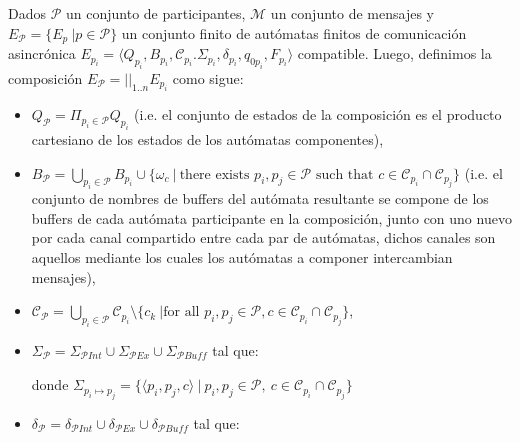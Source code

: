 \begin{definition}[Composición]\label{def:comp}
\label{composicion}
Dados $\mathcal{P}$ un conjunto de participantes, $\mathcal{M}$ un conjunto de mensajes y $E_\mathcal{P} = \{E_{p} \ | p \in \mathcal{P}\}$ un conjunto finito de autómatas finitos de comunicación asincrónica $E_{p_i}= \langle Q_{p_i}, B_{p_i}, \mathcal{C}_{p_i}. \Sigma_{p_i}, \delta_{p_i}, q_{0{p_i}}, F_{p_i} \rangle$ compatible. Luego, definimos la composición $E_\mathcal{P} = ||_{1..n} E_{p_i}$ como sigue:
\begin{itemize}
    \item $Q_\mathcal{P}= \Pi_{p_i \in \mathcal{P}} Q_{p_i}$ (i.e. el conjunto de estados de la composición es el producto cartesiano de los estados de los autómatas componentes),    
    \item $B_\mathcal{P} = \bigcup_{p_i \in \mathcal{P}} B_{p_i} \cup \{ \omega_c \ | \ \mbox{there exists } p_i, p_j \in \mathcal{P} \mbox{ such that } c \in \mathcal{C}_{p_i} \cap \mathcal{C}_{p_j} \}$ (i.e. el conjunto de nombres de buffers del autómata resultante se compone de los buffers de cada autómata participante en la composición, junto con uno nuevo por cada canal compartido entre cada par de autómatas, dichos canales son aquellos mediante los cuales los autómatas a componer intercambian mensajes),    
    \item $\mathcal{C}_\mathcal{P} = \bigcup_{p_i \in \mathcal{P}} \mathcal{C}_{p_i} \setminus \{ c_k \ | \mbox{for all } p_i, p_j \in \mathcal{P}, c \in \mathcal{C}_{p_i} \cap \mathcal{C}_{p_j} \}$,    
    \item $\Sigma_\mathcal{P} = \Sigma_{\mathcal{P}\mathit{Int}} \cup  \Sigma_{\mathcal{P}\mathit{Ex}} \cup \Sigma_{\mathcal{P}\mathit{Buff}}$ tal que:    
donde $\Sigma_\mathit{p_i \mapsto p_j} =\{ \langle p_i,p_j,c \rangle \ | \ p_i, p_j \in \mathcal{P}, \  c \in \mathcal{C}_{p_i} \cap \mathcal{C}_{p_j}\}$
\item $\delta_{\mathcal{P}} = \delta_{\mathcal{P}\mathit{Int}} \cup \delta_{\mathcal{P}\mathit{Ex}} \cup \delta_{\mathcal{P}\mathit{Buff}}$ tal que:

\end{itemize}
\end{definition}
